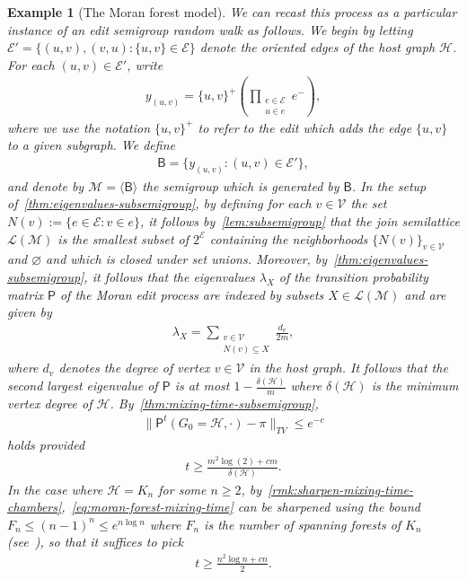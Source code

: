 \documentclass[11pt,a4paper]{article}
\newtheorem{example}[theorem]{Example}
\begin{document}
\begin{example}[The Moran forest model]
	We can recast this process as a particular instance of an edit semigroup random walk as follows. We begin by letting $\mathcal{E}' = \{(u, v), (v, u) : \{u, v\}\in \mathcal{E}\}$ denote the oriented edges of the host graph $\mathcal{H}$. For each $(u, v)\in \mathcal{E}'$, write
		\begin{align*}
			y_{(u, v)} = \{u, v\}^+ \left(\prod_{\substack{e\in \mathcal{E} \\ u\in e}} e^{-}\right),
		\end{align*}
	where we use the notation $\{u, v\}^+$ to refer to the edit which adds the edge $\{u, v\}$ to a given subgraph. We define
		\begin{align*}
			\mathsf{B} = \{y_{(u, v)} : (u, v) \in \mathcal{E}'\},
		\end{align*}
	and denote by $\mathcal{M}=\langle \mathsf{B}\rangle$ the semigroup which is generated by $\mathsf{B}$. In the setup of~\cref{thm:eigenvalues-subsemigroup}, by defining for each $v\in \mathcal{V}$ the set $N(v):=\{e\in \mathcal{E} : v\in e\}$, it follows by~\cref{lem:subsemigroup} that the join semilattice $\mathcal{L}(\mathcal{M})$ is the smallest subset of $2^\mathcal{E}$ containing the neighborhoods $\{N(v)\}_{v\in\mathcal{V}}$ and $\varnothing$ and which is closed under set unions. Moreover, by~\cref{thm:eigenvalues-subsemigroup}, it follows that the eigenvalues $\lambda_X$ of the transition probability matrix $\mathsf{P}$ of the Moran edit process are indexed by subsets $X\in \mathcal{L}(\mathcal{M})$ and are given by
        \begin{align*}
            \lambda_X = \sum_{\substack{v\in \mathcal{V} \\ N(v)\subseteq X}}\frac{d_v}{2 m},
        \end{align*}
    where $d_v$ denotes the degree of vertex $v\in\mathcal{V}$ in the host graph. It follows that the second largest eigenvalue of $\mathsf{P}$ is at most $1-\frac{\delta(\mathcal{H})}{m}$ where $\delta(\mathcal{H})$ is the minimum vertex degree of $\mathcal{H}$. By~\cref{thm:mixing-time-subsemigroup}, 
        \begin{align*}
            \|\mathsf{P}^t(G_0 = \mathcal{H}, \cdot) - \pi\|_{TV}\leq e^{-c}
        \end{align*}
    holds provided
        \begin{align}\label{eq:moran-forest-mixing-time}
            t\geq \frac{m^2\log(2) + cm}{\delta(\mathcal{H})}.
        \end{align}
    In the case where $\mathcal{H} = K_n$ for some $n\geq 2$, by~\cref{rmk:sharpen-mixing-time-chambers},~\cref{eq:moran-forest-mixing-time} can be sharpened using the bound $F_n\leq (n-1)^{n} \leq e^{n\log n}$ where $F_n$ is the number of spanning forests of $K_n$ (see~\cite[Thm. 1.4]{bencs2023upper}), so that it suffices to pick
        \begin{align}\label{eq:moran-forest-mixing-time-Kn}
            t\geq \frac{n^2\log{n} + cn}{2}.
        \end{align}
\end{example}
\end{document}
